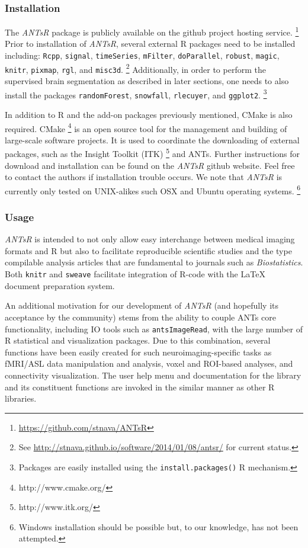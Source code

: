 \documentclass[preprint,authoryear,review,12pt]{elsarticle}
\begin{document}
{\subsubsection{Installation}

The \textit{ANTsR} package is publicly available on the github project hosting service.%
\footnote{
\href{https://github.com/stnava/ANTsR}{https://github.com/stnava/ANTsR}
}
Prior to installation of \textit{ANTsR}, several external R packages
need to be installed including: \verb#Rcpp#, \verb#signal#, \verb#timeSeries#, 
\verb#mFilter#, \verb#doParallel#, \verb#robust#, \verb#magic#, \verb#knitr#, \verb#pixmap#, 
\verb#rgl#, and \verb#misc3d#.%
\footnote{
See \href{http://stnava.github.io/software/2014/01/08/antsr/}{http://stnava.github.io/software/2014/01/08/antsr/} for current status.}
Additionally, in order
to perform the supervised brain segmentation as described 
in later sections, one needs to also install the packages
\verb#randomForest#, \verb#snowfall#, \verb#rlecuyer#,
and \verb#ggplot2#.%
\footnote{
Packages are easily installed using the {\tt install.packages()} R mechanism.
} 

In addition to R and the add-on packages previously mentioned, CMake is also 
required.  CMake%
\footnote{
http://www.cmake.org/
}
is an open source tool for the management and building of 
large-scale software projects.  It is used
to coordinate the downloading of external packages,
such as the Insight Toolkit (ITK)%
\footnote{
http://www.itk.org/
}
and ANTs.  Further instructions for download and
installation can be found on the \textit{ANTsR} github website.  Feel
free to contact the authors if installation trouble occurs.  We note
that \textit{ANTsR} is currently only tested on UNIX-alikes such OSX and Ubuntu
operating systems.%
\footnote{Windows installation should be possible
but, to our knowledge, has not been attempted.}

\subsubsection{Usage}
\textit{ANTsR} is intended to not only allow easy interchange between
medical imaging formats and R but also to facilitate
reproducible scientific studies and the type compilable analysis
articles that are fundamental to journals such as
\textit{Biostatistics}.  Both \verb#knitr# and \verb#sweave#
facilitate integration of R-code with the LaTeX document
preparation system.  

An additional motivation for our development of \textit{ANTsR} (and
hopefully its acceptance by the community) 
stems from the ability to couple ANTs core 
functionality, including IO tools such as \verb#antsImageRead#, 
with the large number of R statistical and
visualization packages.  Due to this combination, several
functions have been easily created for such neuroimaging-specific 
tasks as fMRI/ASL data manipulation and analysis,
voxel and ROI-based  analyses,
and connectivity visualization. %
The user help menu and documentation for the library  and its
constituent functions are invoked in the similar manner as other
R libraries.

}
\end{document}

